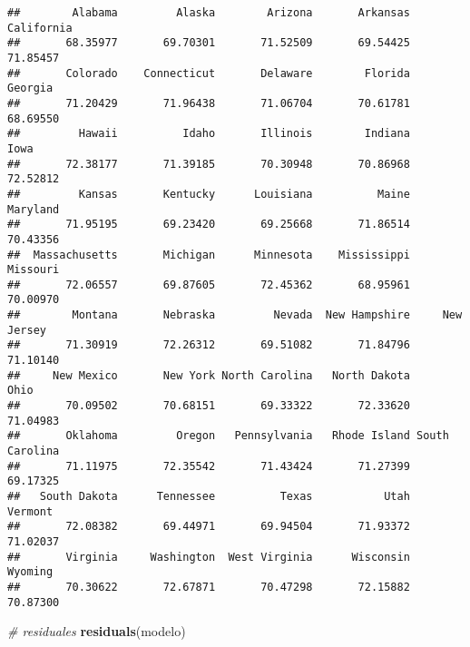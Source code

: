 \documentclass[]{article}
\newenvironment{Shaded}{\begin{snugshade}}{\end{snugshade}}
\newcommand{\KeywordTok}[1]{\textcolor[rgb]{0.13,0.29,0.53}{\textbf{#1}}}
\newcommand{\CommentTok}[1]{\textcolor[rgb]{0.56,0.35,0.01}{\textit{#1}}}
\newcommand{\NormalTok}[1]{#1}
\begin{document}
\begin{verbatim}
##        Alabama         Alaska        Arizona       Arkansas     California 
##       68.35977       69.70301       71.52509       69.54425       71.85457 
##       Colorado    Connecticut       Delaware        Florida        Georgia 
##       71.20429       71.96438       71.06704       70.61781       68.69550 
##         Hawaii          Idaho       Illinois        Indiana           Iowa 
##       72.38177       71.39185       70.30948       70.86968       72.52812 
##         Kansas       Kentucky      Louisiana          Maine       Maryland 
##       71.95195       69.23420       69.25668       71.86514       70.43356 
##  Massachusetts       Michigan      Minnesota    Mississippi       Missouri 
##       72.06557       69.87605       72.45362       68.95961       70.00970 
##        Montana       Nebraska         Nevada  New Hampshire     New Jersey 
##       71.30919       72.26312       69.51082       71.84796       71.10140 
##     New Mexico       New York North Carolina   North Dakota           Ohio 
##       70.09502       70.68151       69.33322       72.33620       71.04983 
##       Oklahoma         Oregon   Pennsylvania   Rhode Island South Carolina 
##       71.11975       72.35542       71.43424       71.27399       69.17325 
##   South Dakota      Tennessee          Texas           Utah        Vermont 
##       72.08382       69.44971       69.94504       71.93372       71.02037 
##       Virginia     Washington  West Virginia      Wisconsin        Wyoming 
##       70.30622       72.67871       70.47298       72.15882       70.87300
\end{verbatim}

\begin{Shaded}
\begin{Highlighting}[]
\CommentTok{# residuales}
\KeywordTok{residuals}\NormalTok{(modelo) }
\end{Highlighting}
\end{Shaded}
\end{document}
